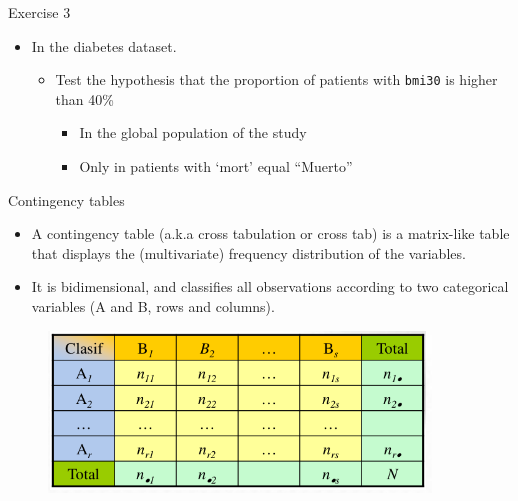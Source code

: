 \documentclass[
  ignorenonframetext,
]{beamer}
\providecommand{\tightlist}{%
  \setlength{\itemsep}{0pt}\setlength{\parskip}{0pt}}
\begin{document}
\begin{frame}[fragile]{Exercise 3}
\protect\hypertarget{exercise-3-1}{}
\begin{itemize}
\item
  In the diabetes dataset.

  \begin{itemize}
  \tightlist
  \item
    Test the hypothesis that the proportion of patients with
    \texttt{bmi30} is higher than 40\%

    \begin{itemize}
    \tightlist
    \item
      In the global population of the study
    \item
      Only in patients with `mort' equal ``Muerto''
    \end{itemize}
  \end{itemize}
\end{itemize}
\end{frame}

\begin{frame}{Contingency tables}
\protect\hypertarget{contingency-tables}{}
\begin{itemize}
\item
  A contingency table (a.k.a cross tabulation or cross tab) is a
  matrix-like table that displays the (multivariate) frequency
  distribution of the variables.
\item
  It is bidimensional, and classifies all observations according to two
  categorical variables (A and B, rows and columns).
\end{itemize}

\begin{figure}
\includegraphics[width=0.8\linewidth]{images/contingencytables1} \end{figure}
\end{frame}
\end{document}
